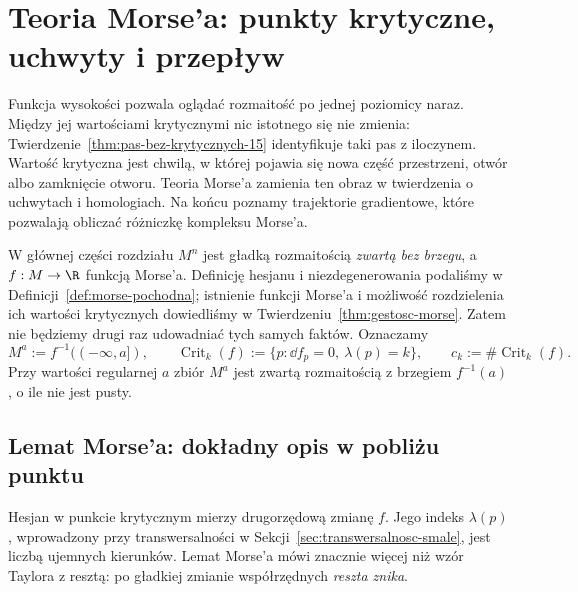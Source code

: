 \chapter{Teoria Morse'a: punkty krytyczne, uchwyty i przepływ}
\label{ch:teoria-morsea}

Funkcja wysokości pozwala oglądać rozmaitość
po jednej poziomicy naraz. Między jej wartościami
krytycznymi nic istotnego się nie zmienia:
Twierdzenie~\ref{thm:pas-bez-krytycznych-15}
identyfikuje taki pas z iloczynem.
Wartość krytyczna jest chwilą, w której
pojawia się nowa część przestrzeni, otwór
albo zamknięcie otworu. Teoria Morse'a
zamienia ten obraz w twierdzenia o uchwytach
i homologiach. Na końcu poznamy trajektorie
gradientowe, które pozwalają obliczać różniczkę
kompleksu Morse'a.

W głównej części rozdziału $M^n$ jest gładką
rozmaitością \emph{zwartą bez brzegu}, a $f:M\to\R$
funkcją Morse'a. Definicję hesjanu
i niezdegenerowania podaliśmy w
Definicji~\ref{def:morse-pochodna}; istnienie
funkcji Morse'a i możliwość rozdzielenia
ich wartości krytycznych dowiedliśmy w
Twierdzeniu~\ref{thm:gestosc-morse}.
Zatem nie będziemy drugi raz udowadniać
tych samych faktów. Oznaczamy
\[
 M^a:=f^{-1}((-\infty,a]),\qquad
 \operatorname{Crit}_k(f)
  :=\{p:\dd f_p=0,\ \lambda(p)=k\},
 \qquad c_k:=\#\operatorname{Crit}_k(f).
\]
Przy wartości regularnej $a$ zbiór $M^a$
jest zwartą rozmaitością z brzegiem
$f^{-1}(a)$, o ile nie jest pusty.

\section{Lemat Morse'a: dokładny opis w pobliżu punktu}
\label{sec:lemat-morsea-17}

Hesjan w punkcie krytycznym mierzy
drugorzędową zmianę $f$. Jego indeks
$\lambda(p)$, wprowadzony przy
transwersalności w
Sekcji~\ref{sec:transwersalnosc-smale},
jest liczbą ujemnych kierunków.
Lemat Morse'a mówi znacznie więcej
niż wzór Taylora z resztą: po gładkiej
zmianie współrzędnych \emph{reszta znika}.

